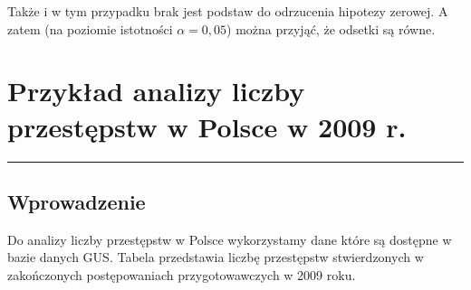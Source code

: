 \documentclass[polish,]{book}
\begin{document}
Także i w tym przypadku brak jest podstaw do odrzucenia hipotezy zerowej. A
zatem (na poziomie istotności \(\alpha = 0,05\)) można przyjąć, że odsetki są równe.

\hypertarget{part_12}{%
\chapter{Przykład analizy liczby przestępstw w Polsce w 2009 r.}\label{part_12}}

\begin{center}\rule{0.5\linewidth}{\linethickness}\end{center}

\hypertarget{part_12.1}{%
\section{Wprowadzenie}\label{part_12.1}}

Do analizy liczby przestępstw w Polsce wykorzystamy dane które są dostępne w bazie
danych GUS. Tabela przedstawia liczbę przestępstw stwierdzonych w zakończonych
postępowaniach przygotowawczych w 2009 roku.
\end{document}
